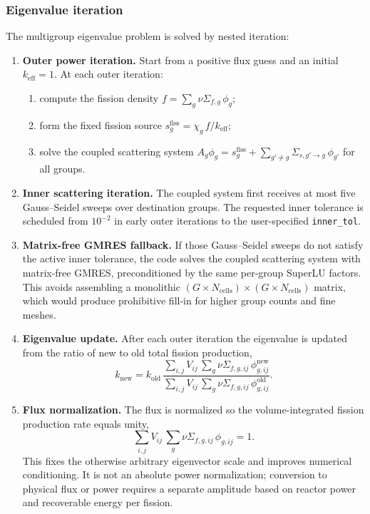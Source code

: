 \documentclass[11pt]{article}
\begin{document}
\subsubsection{Eigenvalue iteration}

The multigroup eigenvalue problem is solved by nested iteration:

\begin{enumerate}
  \item \textbf{Outer power iteration.}  Start from a positive flux guess
        and an initial $k_{\mathrm{eff}} = 1$.  At each outer iteration:
        \begin{enumerate}
          \item compute the fission density $f = \sum_g \nu\Sigma_{f,g}\,\phi_g$;
          \item form the fixed fission source $s^{\mathrm{fiss}}_g
                = \chi_g\,f / k_{\mathrm{eff}}$;
          \item solve the coupled scattering system
                $A_g \phi_g = s^{\mathrm{fiss}}_g
                + \sum_{g'\neq g} \Sigma_{s,g'\to g}\,\phi_{g'}$
                for all groups.
        \end{enumerate}
  \item \textbf{Inner scattering iteration.}  The coupled system first receives
        at most five Gauss--Seidel sweeps over destination groups.  The
        requested inner tolerance is scheduled from $10^{-2}$ in early outer
        iterations to the user-specified \texttt{inner\_tol}.
  \item \textbf{Matrix-free GMRES fallback.}  If those Gauss--Seidel sweeps do
        not satisfy the active inner tolerance, the code solves the coupled
        scattering system with matrix-free GMRES, preconditioned by the same
        per-group SuperLU factors.  This avoids assembling a monolithic
        $(G \times N_{\mathrm{cells}}) \times (G \times N_{\mathrm{cells}})$
        matrix, which would produce prohibitive fill-in for higher group
        counts and fine meshes.
  \item \textbf{Eigenvalue update.}  After each outer iteration the eigenvalue
        is updated from the ratio of new to old total fission production,
        \[
        k_{\mathrm{new}}
        = k_{\mathrm{old}}\,
        \frac{\sum_{i,j} V_{ij}\,\sum_g \nu\Sigma_{f,g,ij}\,\phi_{g,ij}^{\mathrm{new}}}
             {\sum_{i,j} V_{ij}\,\sum_g \nu\Sigma_{f,g,ij}\,\phi_{g,ij}^{\mathrm{old}}} .
        \]
  \item \textbf{Flux normalization.}  The flux is normalized so the
        volume-integrated fission production rate equals unity,
        \[
        \sum_{i,j} V_{ij}\,\sum_g \nu\Sigma_{f,g,ij}\,\phi_{g,ij} = 1 .
        \]
        This fixes the otherwise arbitrary eigenvector scale and improves
        numerical conditioning.  It is not an absolute power normalization;
        conversion to physical flux or power requires a separate amplitude
        based on reactor power and recoverable energy per fission.
\end{enumerate}
\end{document}
